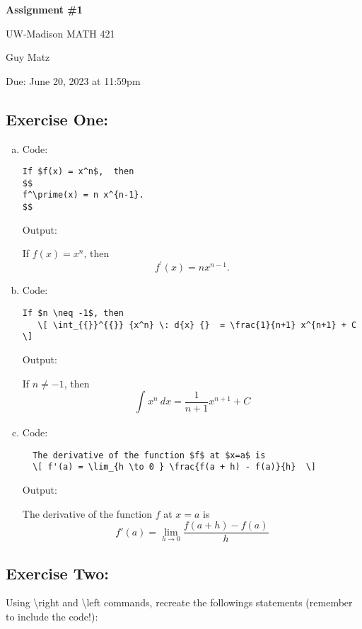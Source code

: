 \documentclass{article} %
\begin{document}
\begin{center}
\Large{\textbf{Assignment \#1}
            
UW-Madison MATH 421} %
\vspace{5pt}

\normalsize{  Guy Matz%

Due:  June 20, 2023 at 11:59pm}        
\vspace{15pt}

\end{center}


\subsection*{Exercise One:} 
    
\begin{enumerate}[(a)]
  \item Code:
\begin{verbatim}
If $f(x) = x^n$,  then 
$$
f^\prime(x) = n x^{n-1}.
$$
\end{verbatim}

Output:

If $f(x) = x^n$,  then 
$$
f^\prime(x) = n x^{n-1}.
$$
\item Code:
\begin{verbatim}
If $n \neq -1$, then
   \[ \int_{{}}^{{}} {x^n} \: d{x} {}  = \frac{1}{n+1} x^{n+1} + C \]
\end{verbatim}

Output:

If $n \neq -1$, then
   \[ \int_{{}}^{{}} {x^n} \: d{x} {}  = \frac{1}{n+1} x^{n+1} + C \]

\item Code:
\begin{verbatim}
  The derivative of the function $f$ at $x=a$ is
  \[ f'(a) = \lim_{h \to 0 } \frac{f(a + h) - f(a)}{h}  \]
\end{verbatim}
Output:

  The derivative of the function $f$ at $x=a$ is
  \[ f'(a) = \lim_{h \to 0 } \frac{f(a + h) - f(a)}{h}  \]

\end{enumerate}

\newpage

\subsection*{Exercise Two:}
Using \textbackslash{}right and \textbackslash{}left commands, recreate the followings statements (remember to include the code!):
\end{document}
